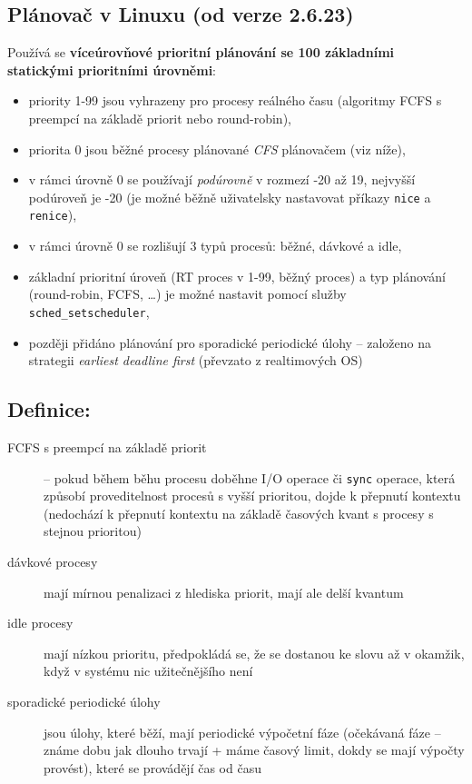 \documentclass[a4paper, 11pt]{article}
\newcommand{\tcmd}[1]{\texttt{#1}}
\begin{document}
\subsection{Plánovač v Linuxu (od verze 2.6.23)}
Používá se \textbf{víceúrovňové prioritní plánování se 100 základními statickými prioritními úrovněmi}:
\begin{itemize}
    \item priority 1-99 jsou vyhrazeny pro procesy reálného času (algoritmy FCFS s preempcí na základě priorit nebo round-robin),
    \item priorita 0 jsou běžné procesy plánované \emph{CFS} plánovačem (viz níže),
    \item v rámci úrovně 0 se používají \emph{podúrovně} v rozmezí -20 až 19, nejvyšší podúroveň je -20 (je možné běžně uživatelsky nastavovat příkazy \tcmd{nice} a \tcmd{renice}),
    \item v rámci úrovně 0 se rozlišují 3 typů procesů: běžné, dávkové a idle,
    \item základní prioritní úroveň (RT proces v 1-99, běžný proces) a typ plánování (round-robin, FCFS, \ldots) je možné nastavit pomocí služby \tcmd{sched\_setscheduler},
    \item později přidáno plánování pro sporadické periodické úlohy -- založeno na strategii \emph{earliest deadline first} (převzato z realtimových OS) \\
\end{itemize}
 
\subsection*{Definice:}
\begin{description}
\item[FCFS s preempcí na základě priorit] --  pokud během běhu procesu doběhne I/O operace či \tcmd{sync} operace, která způsobí proveditelnost procesů s vyšší prioritou, dojde k přepnutí kontextu  (nedochází k přepnutí kontextu na základě časových kvant s procesy s stejnou prioritou)

\item[dávkové procesy] mají mírnou penalizaci z hlediska priorit, mají ale delší kvantum

\item[idle procesy] mají nízkou prioritu, předpokládá se, že se dostanou ke slovu až v okamžik, když v systému nic užitečnějšího není

\item[sporadické periodické úlohy] jsou úlohy, které běží, mají periodické výpočetní fáze (očekávaná fáze -- známe dobu jak dlouho trvají + máme časový limit, dokdy se mají výpočty provést), které se provádějí čas od času
\end{description}
\end{document}

